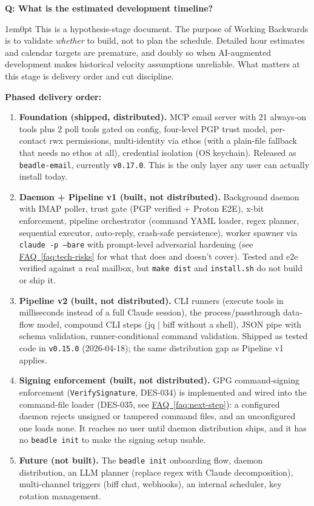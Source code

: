 \documentclass[11pt,letterpaper]{article}
\newcounter{faqnum}
\newenvironment{faqpair}[1]{%
  \needspace{4\baselineskip}%
  \vspace{0.5em}%
  \refstepcounter{faqnum}%
  \noindent\textbf{\color{SectionBlue}Q\thefaqnum: #1}\par\nopagebreak[4]%
  \vspace{0.2em}%
  \begin{adjustwidth}{1em}{0pt}%
  \setlength{\parindent}{0pt}%
}{%
  \end{adjustwidth}%
  \vspace{0.5em}%
}
\newcommand{\faqref}[1]{\hyperref[#1]{FAQ~\ref*{#1}}}
\begin{document}
\begin{faqpair}{What is the estimated development timeline?}\label{faq:timeline}
  This is a hypothesis-stage document. The purpose of Working Backwards is
  to validate \textit{whether} to build, not to plan the schedule. Detailed
  hour estimates and calendar targets are premature, and doubly so when
  AI-augmented development makes historical velocity assumptions unreliable.
  What matters at this stage is delivery order and cut discipline.

  \textbf{Phased delivery order:}

  \begin{enumerate}[nosep]
    \item \textbf{Foundation (shipped, distributed).} MCP email server
      with 21 always-on tools plus 2 poll tools gated on config,
      four-level PGP trust model, per-contact rwx
      permissions, multi-identity via ethos (with a plain-file fallback
      that needs no ethos at all), credential isolation (OS keychain).
      Released as \texttt{beadle-email}, currently \texttt{v0.17.0}. This
      is the only layer any user can actually install today.
    \item \textbf{Daemon + Pipeline v1 (built, not distributed).}
      Background daemon with IMAP poller, trust gate (PGP verified +
      Proton E2E), x-bit enforcement, pipeline orchestrator (command YAML
      loader, regex planner, sequential executor, auto-reply, crash-safe
      persistence), worker spawner via \texttt{claude -p --bare} with
      prompt-level adversarial hardening (see \faqref{faq:tech-risks} for
      what that does and doesn't cover). Tested and e2e verified against a
      real mailbox, but \texttt{make dist} and \texttt{install.sh} do not
      build or ship it.
    \item \textbf{Pipeline v2 (built, not distributed).} CLI runners
      (execute tools in milliseconds instead of a full Claude session),
      the process/passthrough data-flow model, compound CLI steps
      (jq | biff without a shell), JSON pipe with schema validation,
      runner-conditional command validation. Shipped as tested code in
      \texttt{v0.15.0} (2026-04-18); the same distribution gap as
      Pipeline v1 applies.
    \item \textbf{Signing enforcement (built, not distributed).} GPG
      command-signing enforcement ({\small\texttt{VerifySignature}},
      DES-034) is implemented and wired into the command-file loader
      (DES-035, see \faqref{faq:next-step}): a configured daemon rejects
      unsigned or tampered command files, and an unconfigured one loads
      none. It reaches no user until daemon distribution ships, and it has
      no {\small\texttt{beadle init}} to make the signing setup usable.
    \item \textbf{Future (not built).} The {\small\texttt{beadle init}}
      onboarding flow, daemon distribution, an LLM planner (replace regex
      with Claude decomposition), multi-channel triggers (biff chat,
      webhooks), an internal scheduler, key rotation management.
  \end{enumerate}


\end{faqpair}
\end{document}
